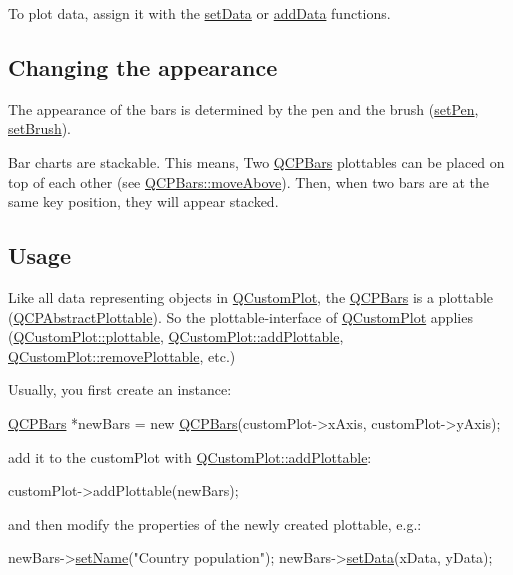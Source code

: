 To plot data, assign it with the \hyperlink{classQCPBars_aa3435aab19e0a49e4e7b41bd36a8d96b}{set\-Data} or \hyperlink{classQCPBars_a1f29cf08615040993209147fa68de3f2}{add\-Data} functions.\hypertarget{classQCPStatisticalBox_appearance}{}\subsection{Changing the appearance}\label{classQCPStatisticalBox_appearance}
The appearance of the bars is determined by the pen and the brush (\hyperlink{classQCPAbstractPlottable_ab74b09ae4c0e7e13142fe4b5bf46cac7}{set\-Pen}, \hyperlink{classQCPAbstractPlottable_a7a4b92144dca6453a1f0f210e27edc74}{set\-Brush}).

Bar charts are stackable. This means, Two \hyperlink{classQCPBars}{Q\-C\-P\-Bars} plottables can be placed on top of each other (see \hyperlink{classQCPBars_ac22e00a6a41509538c21b04f0a57318c}{Q\-C\-P\-Bars\-::move\-Above}). Then, when two bars are at the same key position, they will appear stacked.\hypertarget{classQCPStatisticalBox_usage}{}\subsection{Usage}\label{classQCPStatisticalBox_usage}
Like all data representing objects in \hyperlink{classQCustomPlot}{Q\-Custom\-Plot}, the \hyperlink{classQCPBars}{Q\-C\-P\-Bars} is a plottable (\hyperlink{classQCPAbstractPlottable}{Q\-C\-P\-Abstract\-Plottable}). So the plottable-\/interface of \hyperlink{classQCustomPlot}{Q\-Custom\-Plot} applies (\hyperlink{classQCustomPlot_a32de81ff53e263e785b83b52ecd99d6f}{Q\-Custom\-Plot\-::plottable}, \hyperlink{classQCustomPlot_ab7ad9174f701f9c6f64e378df77927a6}{Q\-Custom\-Plot\-::add\-Plottable}, \hyperlink{classQCustomPlot_af3dafd56884208474f311d6226513ab2}{Q\-Custom\-Plot\-::remove\-Plottable}, etc.)

Usually, you first create an instance\-: 
\begin{DoxyCode}
\hyperlink{classQCPBars}{QCPBars} *newBars = \textcolor{keyword}{new} \hyperlink{classQCPBars_a64006999ad9dff308f40df41cef176ad}{QCPBars}(customPlot->xAxis, customPlot->yAxis);
\end{DoxyCode}
 add it to the custom\-Plot with \hyperlink{classQCustomPlot_ab7ad9174f701f9c6f64e378df77927a6}{Q\-Custom\-Plot\-::add\-Plottable}\-: 
\begin{DoxyCode}
customPlot->addPlottable(newBars);
\end{DoxyCode}
 and then modify the properties of the newly created plottable, e.\-g.\-: 
\begin{DoxyCode}
newBars->\hyperlink{classQCPAbstractPlottable_ab79c7ba76bc7fa89a4b3580e12149f1f}{setName}(\textcolor{stringliteral}{"Country population"});
newBars->\hyperlink{classQCPBars_aa3435aab19e0a49e4e7b41bd36a8d96b}{setData}(xData, yData);
\end{DoxyCode}
 

